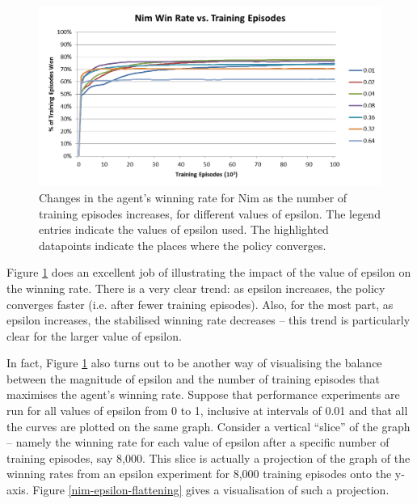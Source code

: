 \documentclass[11pt,a4paper]{report}
\begin{document}
\begin{figure}[htbp]
	\begin{center}
		\includegraphics[width=\linewidth]{Nim_PerformanceResults_Comparison_001_to_064.png}
		\caption{Changes in the agent's winning rate for Nim as the number of training episodes increases, for different values of epsilon. The legend entries indicate the values of epsilon used. The highlighted datapoints indicate the places where the policy converges.}
		\label{nim-convergence-comparison}
	\end{center}
\end{figure}

Figure \ref{nim-convergence-comparison} does an excellent job of illustrating the impact of the value of epsilon on the winning rate. There is a very clear trend: as epsilon increases, the policy converges faster (i.e. after fewer training episodes). Also, for the most part, as epsilon increases, the stabilised winning rate decreases -- this trend is particularly clear for the larger value of epsilon.

In fact, Figure \ref{nim-convergence-comparison} also turns out to be another way of visualising the balance between the magnitude of epsilon and the number of training episodes that maximises the agent's winning rate. Suppose that performance experiments are run for all values of epsilon from 0 to 1, inclusive at intervals of 0.01 and that all the curves are plotted on the same graph. Consider a vertical ``slice'' of the graph -- namely the winning rate for each value of epsilon after a specific number of training episodes, say 8,000. This slice is actually a projection of the graph of the winning rates from an epsilon experiment for 8,000 training episodes onto the y-axis. Figure \ref{nim-epsilon-flattening} gives a visualisation of such a projection.
\end{document}
